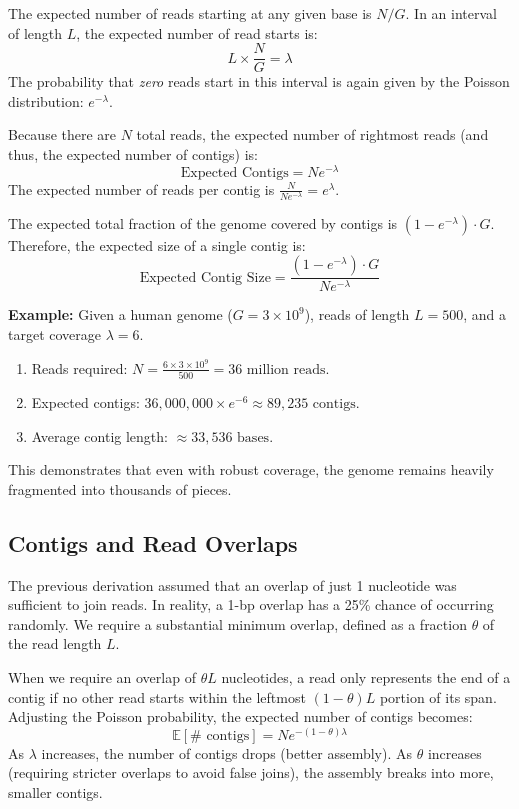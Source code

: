 The expected number of reads starting at any given base is \( N / G \).
In an interval of length \( L \), the expected number of read starts is:
\[ L \times \frac{N}{G} = \lambda \]
The probability that \textit{zero} reads start in this interval is again given by the Poisson distribution: \( e^{-\lambda} \).

Because there are \( N \) total reads, the expected number of rightmost reads (and thus, the expected number of contigs) is:
\[ \text{Expected Contigs} = N e^{-\lambda} \]
The expected number of reads per contig is \( \frac{N}{N e^{-\lambda}} = e^\lambda \).

The expected total fraction of the genome covered by contigs is \( (1 - e^{-\lambda}) \cdot G \). Therefore, the expected size of a single contig is:
\[ \text{Expected Contig Size} = \frac{(1 - e^{-\lambda}) \cdot G}{N e^{-\lambda}} \]

\textbf{Example:}
Given a human genome (\( G = 3 \times 10^9 \)), reads of length \( L = 500 \), and a target coverage \( \lambda = 6 \).
\begin{enumerate}
    \item Reads required: \( N = \frac{6 \times 3 \times 10^9}{500} = 36 \text{ million reads} \).
    \item Expected contigs: \( 36,000,000 \times e^{-6} \approx 89,235 \text{ contigs} \).
    \item Average contig length: \( \approx 33,536 \text{ bases} \).
\end{enumerate}
This demonstrates that even with robust coverage, the genome remains heavily fragmented into thousands of pieces.

\subsection{Contigs and Read Overlaps}
The previous derivation assumed that an overlap of just 1 nucleotide was sufficient to join reads. In reality, a 1-bp overlap has a 25\% chance of occurring randomly. We require a substantial minimum overlap, defined as a fraction \( \theta \) of the read length \( L \). 

When we require an overlap of \( \theta L \) nucleotides, a read only represents the end of a contig if no other read starts within the leftmost \( (1 - \theta) L \) portion of its span. Adjusting the Poisson probability, the expected number of contigs becomes:
\[ \mathbb{E}[\# \text{ contigs}] = N e^{-(1 - \theta) \lambda} \]
As \( \lambda \) increases, the number of contigs drops (better assembly). As \( \theta \) increases (requiring stricter overlaps to avoid false joins), the assembly breaks into more, smaller contigs.

